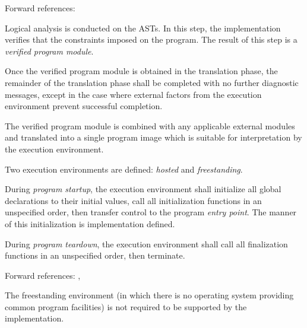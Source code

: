 Forward references: 

\specsubitem
Logical analysis is conducted on the ASTs. In this step, the implementation
verifies that the constraints imposed on the program. The result of this step is
a \textit{verified program module}.


\specsubitem
Once the verified program module is obtained in the translation phase, the
remainder of the translation phase shall be completed with no further
diagnostic messages, except in the case where external factors from the
execution environment prevent successful completion.


\specsubitem
The verified program module is combined with any applicable external modules and
translated into a single program image which is suitable for interpretation by
the execution environment.


\specsubitem
Two execution environments are defined: \textit{hosted} and
\textit{freestanding}.

\specsubitem
During \textit{program startup}, the execution environment shall initialize all
global declarations to their initial values, call all initialization functions
in an unspecified order, then transfer control to the program \textit{entry
point}. The manner of this initialization is implementation defined.


\specsubitem
During \textit{program teardown}, the execution environment shall call all
finalization functions in an unspecified order, then terminate.

Forward references: , 


\specsubsubitem
The freestanding environment (in which there is no operating system providing
common program facilities) is not required to be supported by the
implementation.

